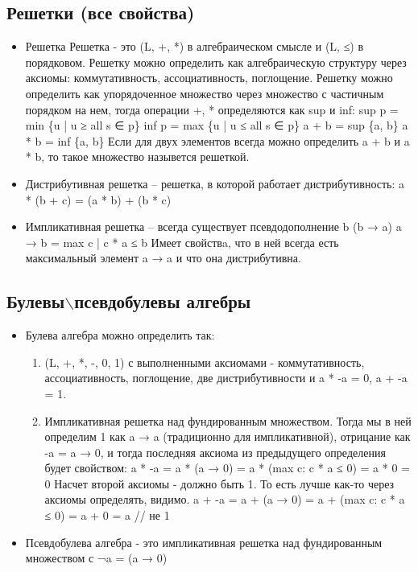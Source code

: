 \documentclass[11pt]{article}
\begin{document}
\subsection{Решетки (все свойства)}
\label{sec-2-8}
\begin{itemize}
\item Решетка
Решетка - это (L, +, *) в алгебраическом смысле и (L, ≤) в порядковом.
Решетку можно определить как алгебраическую структуру через
аксиомы: коммутативность, ассоциативность, поглощение.
Решетку можно определить как упорядоченное множество через
множество с частичным порядком на нем, тогда операции +, * определяются
как sup и inf:
sup p = min \{u | u ≥ all s ∈ p\}
inf p = max \{u | u ≤ all s ∈ p\}
a + b = sup \{a, b\}
a * b = inf \{a, b\}
Если для двух элементов всегда можно определить a + b и a * b, то такое
множество назывется решеткой.
\item Дистрибутивная решетка -- решетка, в которой работает дистрибутивность:
a * (b + c) = (a * b) + (b * c)
\item Импликативная решетка -- всегда существует псевдодополнение b (b → a)
a → b = max c | c * a ≤ b
Имеет свойствa, что в ней всегда есть максимальный элемент a → a и что
она дистрибутивна.
\end{itemize}
\subsection{Булевы$\backslash$псевдобулевы алгебры}
\label{sec-2-9}
\begin{itemize}
\item Булева алгебра можно определить так:
\begin{enumerate}
\item (L, +, *, -, 0, 1) с выполненными аксиомами - коммутативность,
ассоциативность, поглощение, две дистрибутивности и a * -a = 0,
a + -a = 1.
\item Импликативная решетка над фундированным множеством.
Тогда мы в ней определим 1 как a → a (традиционно для импликативной),
отрицание как -a = a → 0, и тогда последняя аксиома из
предыдущего определения будет свойством:
a * -a = a * (a → 0) = a * (max c: c * a ≤ 0) = a * 0 = 0
Насчет второй аксиомы - должно быть 1. То есть лучше как-то
через аксиомы определять, видимо.
a + -a = a + (a → 0) = a + (max c: c * a ≤ 0) = a + 0 = a // не 1
\end{enumerate}
\item Псевдобулева алгебра - это импликативная решетка над фундированным
множеством с ¬a = (a → 0)
\end{itemize}
\end{document}
